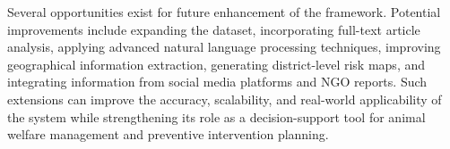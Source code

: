 \documentclass[conference]{IEEEtran}
\begin{document}
Several opportunities exist for future enhancement of the framework. Potential improvements include expanding the dataset, incorporating full-text article analysis, applying advanced natural language processing techniques, improving geographical information extraction, generating district-level risk maps, and integrating information from social media platforms and NGO reports. Such extensions can improve the accuracy, scalability, and real-world applicability of the system while strengthening its role as a decision-support tool for animal welfare management and preventive intervention planning.



\end{document}
